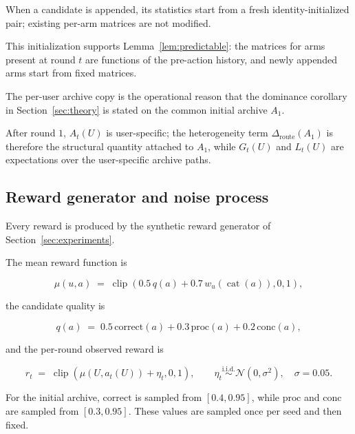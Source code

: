 \documentclass{article} %
\begin{document}
When a candidate is appended, its statistics start from a fresh
identity-initialized pair; existing per-arm matrices are not modified.

This initialization supports Lemma~\ref{lem:predictable}: the
matrices for arms present at round \(t\) are functions of the pre-action
history, and newly appended arms start from fixed matrices.

The per-user archive copy is the operational reason that the dominance corollary in Section~\ref{sec:theory} is stated on the common initial archive $A_1$.

After round $1$, $A_t(U)$ is user-specific; the heterogeneity term $\Delta_{\mathrm{route}}(A_1)$ is therefore the structural quantity attached to $A_1$, while $G_t(U)$ and $L_t(U)$ are expectations over the user-specific archive paths.

\subsection{Reward generator and noise process}

\label{app:impl-reward}

Every reward is produced by the synthetic reward generator of Section~\ref{sec:experiments}.

The mean reward function is

\begin{equation}
\label{eq:app-impl-mean}
\mu(u,a)
\;=\;
\operatorname{clip}\!\left(
0.5\,q(a)+0.7\,w_u(\operatorname{cat}(a)),0,1
\right),
\end{equation}

the candidate quality is

\begin{equation}
\label{eq:app-impl-q}
q(a) \;=\; 0.5\,\mathrm{correct}(a) + 0.3\,\mathrm{proc}(a) + 0.2\,\mathrm{conc}(a),
\end{equation}

and the per-round observed reward is

\begin{equation}
\label{eq:app-impl-r}
r_t
\;=\;
\operatorname{clip}\!\left(\mu(U,a_t(U))+\eta_t,0,1\right),
\qquad
\eta_t\overset{\mathrm{i.i.d.}}{\sim}\mathcal N(0,\sigma^2),
\quad \sigma=0.05.
\end{equation}

For the initial archive, \(\mathrm{correct}\) is sampled from
\([0.4,0.95]\), while \(\mathrm{proc}\) and \(\mathrm{conc}\) are sampled from
\([0.3,0.95]\). These values are sampled once per seed and then fixed.
\end{document}

